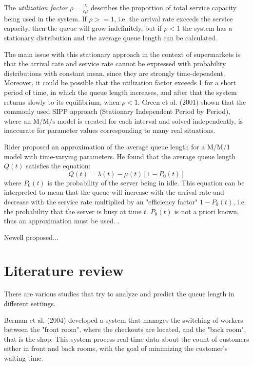 The \emph{utilization factor} \( \rho = \frac{\lambda}{c\mu} \) describes the proportion of total service capacity being used in the system. If \( \rho >= 1\), i.e. the arrival rate exceeds the service capacity, then the queue will grow indefinitely, but if \( \rho < 1\) the system has a stationary distribution and the average queue length can be calculated.

The main issue with this stationary approach in the context of supermarkets is that the arrival rate and service rate cannot be expressed with probability distributions with constant mean, since they are strongly time-dependent. Moreover, it could be possible that the utilization factor exceeds 1 for a short period of time, in which the queue length increases, and after that the system returns slowly to its equilibrium, when \( \rho < 1\). Green et al. (2001) \cite{green} shown that the commonly used SIPP approach (Stationary Independent Period by Period), where an M/M/s model is created for each interval and solved independently, is inaccurate for parameter
values corresponding to many real situations.

Rider \cite{rider} proposed an approximation of the average queue length for a M/M/1 model with time-varying parameters. He found that the average queue length \( Q(t) \) satisfies the equation:
\[ Q(t) = \lambda(t) - \mu(t) [1 - P_0(t)] \]
where \( P_0(t) \) is the probability of the server being in idle. This equation can be interpreted to mean that the queue will increase with the arrival rate and decrease with the service rate multiplied by an "efficiency factor" \( 1 - P_0(t) \), i.e. the probability that the server is busy at time \( t \). \( P_0(t) \) is not a priori known, thus an approximation must be used. .

Newell \cite{newell} proposed...


\section{Literature review}
\label{sec:literature_review}

There are various studies that try to analyze and predict the queue length in different settings.

Berman et al. (2004) \cite{berman} developed a system that manages the switching of workers between the "front room", where the checkouts are located, and the "back room", that is the shop. This system process real-time data about the count of customers either in front and back rooms, with the goal of minimizing the customer's waiting time.

